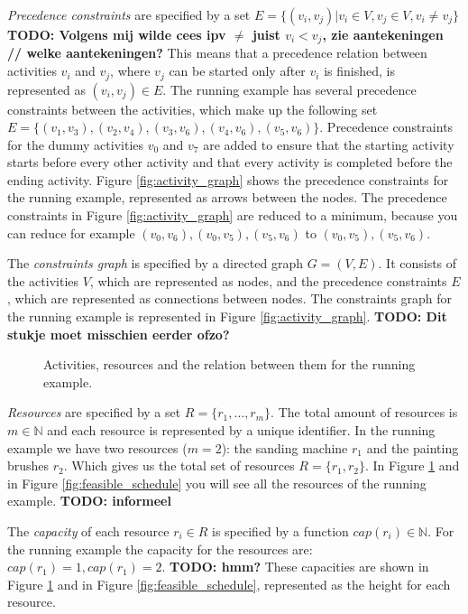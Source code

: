 \documentclass{article}
\theoremstyle{definition}
\newcommand{\TODO}[1]{{\color{red}\textbf{TODO: #1}}}
\newcommand{\capa}[1]{\ensuremath{cap(r_{#1})}} %
\begin{document}
\emph{Precedence constraints} are specified by a set $E = \{(v_i, v_j) | v_i \in V, v_j \in V, v_i \neq v_j\}$ \TODO{Volgens mij wilde cees ipv $\neq$ juist $v_i < v_j$, zie aantekeningen // welke aantekeningen?}
This means that a precedence relation between activities $v_i$ and $v_j$, where $v_j$ can be started only after $v_i$ is finished, is represented as $(v_i, v_j) \in E$.
The running example has several precedence constraints between the activities, which make up the following set $E = \{(v_1, v_3), (v_2, v_4), (v_3, v_6), (v_4, v_6), (v_5, v_6)\}$.
Precedence constraints for the dummy activities $v_0$ and $v_7$ are added to ensure that the starting activity starts before every other activity and that every activity is completed before the ending activity.
Figure \ref{fig:activity_graph} shows the precedence constraints for the running example, represented as arrows between the nodes.
The precedence constraints in Figure \ref{fig:activity_graph} are reduced to a minimum, because you can reduce for example $(v_0,v_6), (v_0, v_5), (v_5, v_6)$ to $(v_0, v_5), (v_5, v_6)$.

The \emph{constraints graph} is specified by a directed graph $G = (V, E)$.
It consists of the activities $V$, which are represented as nodes, and the precedence constraints $E$, which are represented as connections between nodes.
The constraints graph for the running example is represented in Figure \ref{fig:activity_graph}.
\TODO{Dit stukje moet misschien eerder ofzo?}

\begin{figure}[h]
	\centering
	
	\caption{Activities, resources and the relation between them for the running example. }
	\label{fig:resource_graph}
\end{figure}

\emph{Resources} are specified by a set $R = \{r_1, \ldots, r_m\}$.
The total amount of resources is $m \in \mathbb{N}$ and each resource is represented by a unique identifier. %
In the running example we have two resources ($m = 2$): the sanding machine $r_1$ and the painting brushes $r_2$.
Which gives us the total set of resources $R = \{r_1, r_2\}$.
In Figure \ref{fig:resource_graph} and in Figure \ref{fig:feasible_schedule} you will see all the resources of the running example. \TODO{informeel}

The \emph{capacity} of each resource $r_i \in R$ is specified by a function $\capa{i} \in \mathbb{N}$.
For the running example the capacity for the resources are: $\capa{1} = 1, \capa{1} = 2$. \TODO{hmm?}
These capacities are shown in Figure \ref{fig:resource_graph} and in Figure \ref{fig:feasible_schedule}, represented as the height for each resource. 
\end{document}
